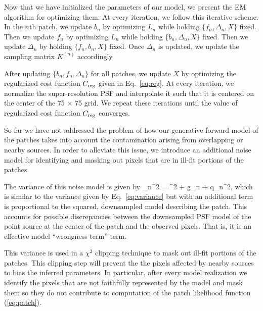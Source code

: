 Now that we have initialized the parameters of our model, we present the EM algorithm for optimizing them. At every iteration, we follow this 
iterative scheme. In the $n$th patch, we update $b_n$ by optimizing $L_n$ while holding $\{f_n, \Delta_n, X\}$ fixed. Then 
we update $f_n$ by optimizing $L_n$ while holding $\{b_n, \Delta_n, X\}$ fixed. Then we update $\Delta_n$ by holding $\{f_n, b_n, X\}$ fixed. 
Once $\Delta_n$ is updated, we update the sampling matrix $K^{(n)}$ accordingly. 

After updating $\{b_n, f_n, \Delta_n\}$ for all patches, we update $X$ 
by optimizing the regularized cost function $C_{\rm reg}$ given in Eq.~\ref{eq:reg}. At every iteration, we normalize the super-resolution PSF and 
interpolate it such that it is centered on the center of the 75 $\times$ 75 grid. We repeat these iterations until the value of regularized cost function 
$C_{\rm reg}$ converges.

So far we have not addressed the problem of how our generative forward model of the patches takes into account the contamination arising from overlapping 
or nearby sources. In order to alleviate this issue, we introduce an additional noise model for identifying and masking out pixels that are 
in ill-fit portions of the patches.

The variance of this noise model is given by
\beq
{}_n^2 = \sigma^{2} + g_{n} + q_{n}^{2},
\label{eq:modified_variance}
\eeq 
which is similar to the variance given by Eq.~\ref{eq:variance} but with an additional term is 
proportional to the squared, downsampled model describing the patch. This accounts for possible discrepancies between the downsampled PSF model of the 
point source at the center of the patch and the observed pixels. That is, it is an effective model ``wrongness term'' term. 

This variance is used in a $\chi^2$ clipping technique to mask out ill-fit portions of the patches. 
This clipping step will prevent the the pixels affected by nearby sources to bias the inferred parameters.
In particular, after every model realization we identify the pixels that are not faithfully represented by the model and mask them so they do not 
contribute to computation of the patch likelihood function (\ref{eq:patch}).
 
